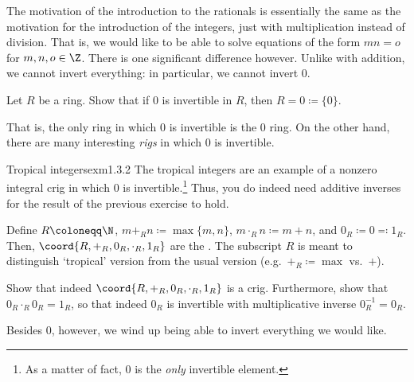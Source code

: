 The motivation of the introduction to the rationals is essentially the same as the motivation for the introduction of the integers, just with multiplication instead of division.  That is, we would like to be able to solve equations of the form $mn=o$ for $m,n,o\in \Z$.  There is one significant difference however.  Unlike with addition, we cannot invert everything:  in particular, we cannot invert $0$.
\begin{exr}{}{}
Let $R$ be a ring.  Show that if $0$ is invertible in $R$, then $R=0\coloneqq \{ 0\}$.
\end{exr}
That is, the only ring in which $0$ is invertible is the $0$ ring.  On the other hand, there are many interesting \emph{rigs} in which $0$ is invertible.
\begin{exm}{Tropical integers}{exm1.3.2}
The tropical integers are an example of a nonzero integral crig in which $0$ is invertible.\footnote{As a matter of fact, $0$ is the \emph{only} invertible element.}  Thus, you do indeed need additive inverses for the result of the previous exercise to hold.

Define $R\coloneqq \N$, $m+_Rn\coloneqq \max \{ m,n\}$, $m\cdot _Rn\coloneqq m+n$, and $0_R\coloneqq 0\eqqcolon 1_R$.  Then, $\coord{R,+_R,0_R,\cdot _R,1_R}$ are the .  The subscript $R$ is meant to distinguish `tropical' version from the usual version (e.g.~$+_R\coloneqq \max$ vs.~$+$).
\begin{exr}[breakable=false]{}{}
Show that indeed $\coord{R,+_R,0_R,\cdot _R,1_R}$ is a crig.  Furthermore, show that $0_R\cdot _R0_R=1_R$, so that indeed $0_R$ is invertible with multiplicative inverse $0_R^{-1}=0_R$.
\end{exr}
\end{exm}
Besides $0$, however, we wind up being able to invert everything we would like.
